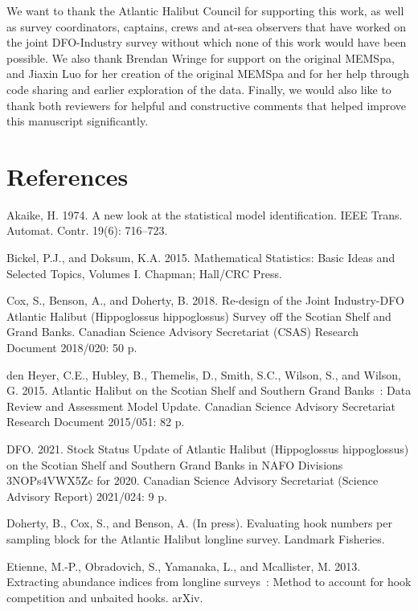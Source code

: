 \documentclass[12pt]{article}\usepackage[]{graphicx}\usepackage[]{color}
\begin{document}
We want to thank the Atlantic Halibut Council for supporting this work, as well as survey coordinators, captains, crews and at-sea observers that have worked on the joint DFO-Industry survey without which none of this work would have been possible. We also thank Brendan Wringe for support on the original MEMSpa, and Jiaxin Luo for her creation of the original MEMSpa and for her help through code sharing and earlier exploration of the data. Finally, we would also like to thank both reviewers for helpful and constructive comments that helped improve this manuscript significantly.

\hypertarget{references}{%
\section{References}\label{references}}

\hypertarget{refs}{}
\leavevmode\hypertarget{ref-Akaike1974}{}%
Akaike, H. 1974. A new look at the statistical model identification. IEEE Trans. Automat. Contr. 19(6): 716--723.

\leavevmode\hypertarget{ref-Bickel2015}{}%
Bickel, P.J., and Doksum, K.A. 2015. Mathematical Statistics: Basic Ideas and Selected Topics, Volumes I. Chapman; Hall/CRC Press.

\leavevmode\hypertarget{ref-Cox2018}{}%
Cox, S., Benson, A., and Doherty, B. 2018. Re-design of the Joint Industry-DFO Atlantic Halibut (Hippoglossus hippoglossus) Survey off the Scotian Shelf and Grand Banks. Canadian Science Advisory Secretariat (CSAS) Research Document 2018/020: 50 p.

\leavevmode\hypertarget{ref-DenHeyer2015}{}%
den Heyer, C.E., Hubley, B., Themelis, D., Smith, S.C., Wilson, S., and Wilson, G. 2015. Atlantic Halibut on the Scotian Shelf and Southern Grand Banks~: Data Review and Assessment Model Update. Canadian Science Advisory Secretariat Research Document 2015/051: 82 p.

\leavevmode\hypertarget{ref-DFO2021}{}%
DFO. 2021. Stock Status Update of Atlantic Halibut (Hippoglossus hippoglossus) on the Scotian Shelf and Southern Grand Banks in NAFO Divisions 3NOPs4VWX5Zc for 2020. Canadian Science Advisory Secretariat (Science Advisory Report) 2021/024: 9 p.

\leavevmode\hypertarget{ref-Doherty2017}{}%
Doherty, B., Cox, S., and Benson, A. (In press). Evaluating hook numbers per sampling block for the Atlantic Halibut longline survey. Landmark Fisheries.

\leavevmode\hypertarget{ref-Etienne2013}{}%
Etienne, M.-P., Obradovich, S., Yamanaka, L., and Mcallister, M. 2013. Extracting abundance indices from longline surveys~: Method to account for hook competition and unbaited hooks. arXiv.
\end{document}
